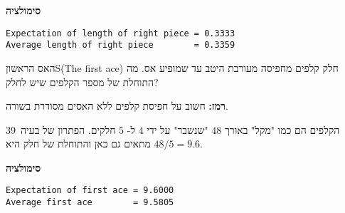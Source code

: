 \textbf{סימולציה}
\begin{verbatim}
Expectation of length of right piece = 0.3333
Average length of right piece        = 0.3359
\end{verbatim}


\begin{prob}{האס הראשון}{S}{(The first ace)}
חלק קלפים מחפיסה מעורבת היטב עד שמופיע אס. מה התוחלת של מספר הקלפים שיש לחלק?

\textbf{רמז:}
חשוב על חפיסת קלפים ללא האסים מסודרת בשורה.
\end{prob}
\solution{}
הקלפים הם כמו "מקל" באורך 
$48$
"שנשבר" על ידי 
$4$
ל-%
$5$
חלקים. הפתרון של בעיה~39 מתאים גם כאן והתוחלת של חלק היא
$48/5=9.6$.

\textbf{סימולציה}
\begin{verbatim}
Expectation of first ace = 9.6000
Average first ace        = 9.5805
\end{verbatim}


